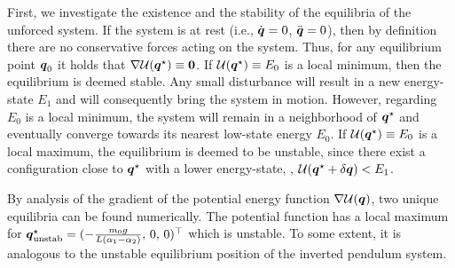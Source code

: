 \newpage
First, we investigate the existence and the stability of the equilibria of the unforced system. If the system is at rest (i.e., ${\dot{\boldsymbol{q}}} = 0$, ${\ddot{\boldsymbol{q}}} = 0$), then by definition there are no conservative forces acting on the system. Thus, for any equilibrium point ${{\boldsymbol{q}}}_0$ it holds that $\nabla \mathcal{U}({{\boldsymbol{q}}}^\star) \equiv \boldsymbol{0}$. If $ \mathcal{U}({{\boldsymbol{q}}}^\star) \equiv E_0$ is a local minimum, then the equilibrium is deemed stable. Any small disturbance will result in a new energy-state $E_1$ and will consequently bring the system in motion. However, regarding $E_0$ is a local minimum, the system will remain in a neighborhood of ${{\boldsymbol{q}}}^\star$ and eventually converge towards its nearest low-state energy $E_0$. If $\mathcal{U}({{\boldsymbol{q}}}^\star) \equiv E_0$ is a local maximum, the equilibrium is deemed to be unstable, since there exist a configuration close to ${{\boldsymbol{q}}}^\star$ with a lower energy-state, \ie, $\mathcal{U}({{\boldsymbol{q}}}^\star + {\delta}{\boldsymbol{q}}) < E_1$.

By analysis of the gradient of the potential energy function $\nabla \mathcal{U}({{\boldsymbol{q}}})$, two unique equilibria can be found numerically. The potential function has a local maximum for ${\boldsymbol{q}}^\star_{\textrm{unstab}}=(-\tfrac{m_0 g}{L (\alpha_1 - \alpha_2)},\,0,\,0)^\top$ which is unstable. To some extent, it is analogous to the unstable equilibrium position of the inverted pendulum system. 

